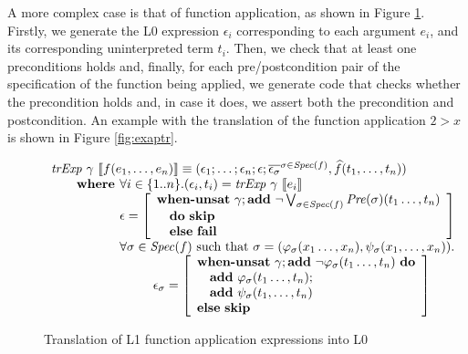 A more complex case is that of function application, as shown in Figure 
\ref{fig:functr}. Firstly, we generate the L0 expression $\epsilon_i$
corresponding to each argument $e_i$, and its corresponding uninterpreted term
$t_i$. Then, we check that at least one preconditions holds and, finally, for
each pre/postcondition pair of the specification of the function being applied,
we generate code that checks whether the precondition holds and, in case it
does, we assert both the precondition and postcondition. An example with the 
translation of the function application $2 > x$ is shown in Figure
\ref{fig:exaptr}.

\begin{figure}
\[
\begin{array}{l}
\trExp{\gamma}{f(e_1, \ldots, e_n)} \equiv (\epsilon_1; \dots; \epsilon_n; \epsilon; \overline{\epsilon_\sigma}^{\sigma \in \Spec{f}}, \widehat{f}(t_1, \ldots, t_n))\\
\qquad \textbf{where } \forall i \in \{1..n\}. (\epsilon_i, t_i) = \trExp{\gamma}{e_i}\\
\qquad \phantom{\textbf{where }} \epsilon = \left[ 
  \begin{array}{l}
  \whenUnsatW~\gamma;\addE~\neg \bigvee_{\sigma \in \Spec{f}}\Pre{\sigma}(t_1\ldots,t_n)\\
  \quad\doW~\skipE\\
  \quad\elseW~\failE\\
  \end{array}
  \right]\\
\qquad \phantom{\textbf{where }} \forall \sigma \in \Spec{f} \textrm{ such that } \sigma = (\varphi_\sigma(x_1\ldots,x_n), \psi_\sigma(x_1, \ldots, x_n)).\\
\qquad\qquad\qquad\qquad \epsilon_\sigma = \left[ 
\begin{array}{l}
\whenUnsatW~\gamma;\addE~\neg \varphi_\sigma(t_1\ldots,t_n)~\doW\\
\quad\addE~\varphi_\sigma(t_1\ldots,t_n);\\
\quad\addE~\psi_\sigma(t_1,\ldots,t_n)\\
\elseW~\skipE\\
\end{array}
\right] \\
\end{array}
\]
\caption{Translation of L1 function application expressions into L0}
\label{fig:functr}
\end{figure}

